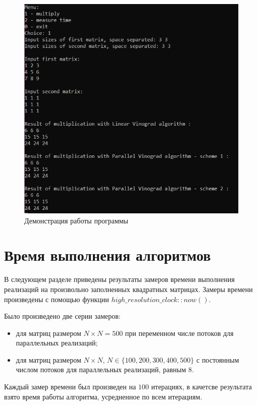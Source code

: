 \documentclass[12pt]{report}
\begin{document}
\begin{figure}[h]
	\begin{center}
	\includegraphics[scale=1]{example.png}
	 \caption{Демонстрация работы программы}
	\end{center}
\end{figure}

\section{Время выполнения алгоритмов}
В следующем разделе приведены результаты замеров времени выполнения реализаций на произвольно заполненных квадратных матрицах. Замеры времени произведены с помощью функции $high\_resolution\_clock::now()$.

Было произведено две серии замеров: 
\begin{itemize}
	\item для матриц размером $N \times N = 500$ при переменном числе потоков для параллельных реализаций;
	\item для матриц размером $N \times N$, $N \in \{ 100, 200, 300, 400, 500 \}$ с постоянным числом потоков для параллельных реализаций, равным 8.
\end{itemize}

Каждый замер времени был произведен на $100$ итерациях, в качетсве результата взято время работы алгоритма, усредненное по всем итерациям.  
\newline
\end{document}
